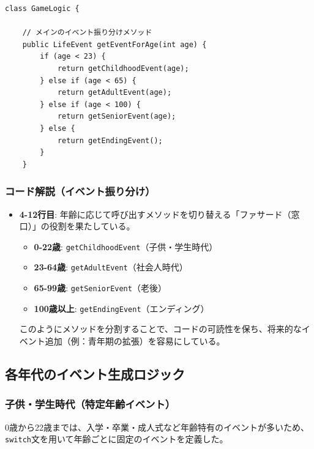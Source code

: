\documentclass[a4paper,11pt]{jsarticle}
\begin{document}
\begin{lstlisting}[caption=GameLogic.java（イベント振り分け）, label=code:gamelogic_main]
class GameLogic {

    // メインのイベント振り分けメソッド
    public LifeEvent getEventForAge(int age) {
        if (age < 23) {
            return getChildhoodEvent(age);
        } else if (age < 65) {
            return getAdultEvent(age);
        } else if (age < 100) {
            return getSeniorEvent(age);
        } else {
            return getEndingEvent();
        }
    }
\end{lstlisting}

\subsubsection*{コード解説（イベント振り分け）}
\begin{itemize}
    \item \textbf{4-12行目}: 年齢に応じて呼び出すメソッドを切り替える「ファサード（窓口）」の役割を果たしている。
    \begin{itemize}
        \item \textbf{0-22歳}: \texttt{getChildhoodEvent}（子供・学生時代）
        \item \textbf{23-64歳}: \texttt{getAdultEvent}（社会人時代）
        \item \textbf{65-99歳}: \texttt{getSeniorEvent}（老後）
        \item \textbf{100歳以上}: \texttt{getEndingEvent}（エンディング）
    \end{itemize}
    このようにメソッドを分割することで、コードの可読性を保ち、将来的なイベント追加（例：青年期の拡張）を容易にしている。
\end{itemize}

\subsection{各年代のイベント生成ロジック}

\subsubsection{子供・学生時代（特定年齢イベント）}
0歳から22歳までは、入学・卒業・成人式など年齢特有のイベントが多いため、\texttt{switch}文を用いて年齢ごとに固定のイベントを定義した。
\end{document}
